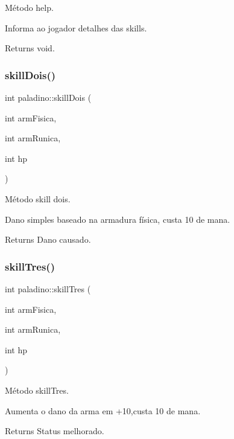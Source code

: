 Método help. 

Informa ao jogador detalhes das skills. \begin{DoxyReturn}{Returns}
void. 
\end{DoxyReturn}
\mbox{\label{classpaladino_a62a3129268222902926377c6dd0dceb5}} 
\subsubsection{\texorpdfstring{skill\+Dois()}{skillDois()}}
{\footnotesize\ttfamily int paladino\+::skill\+Dois (\begin{DoxyParamCaption}\item[{int}]{arm\+Fisica,  }\item[{int}]{arm\+Runica,  }\item[{int}]{hp }\end{DoxyParamCaption})}



Método skill dois. 

Dano simples baseado na armadura física, custa 10 de mana. \begin{DoxyReturn}{Returns}
Dano causado. 
\end{DoxyReturn}
\mbox{\label{classpaladino_acd4e68058d2504c07989af88ace6d57b}} 
\subsubsection{\texorpdfstring{skill\+Tres()}{skillTres()}}
{\footnotesize\ttfamily int paladino\+::skill\+Tres (\begin{DoxyParamCaption}\item[{int}]{arm\+Fisica,  }\item[{int}]{arm\+Runica,  }\item[{int}]{hp }\end{DoxyParamCaption})}



Método skill\+Tres. 

Aumenta o dano da arma em +10,custa 10 de mana. \begin{DoxyReturn}{Returns}
Status melhorado. 
\end{DoxyReturn}
\mbox{\label{classpaladino_aaf70250e226146bab3bb421b253483d5}} 
